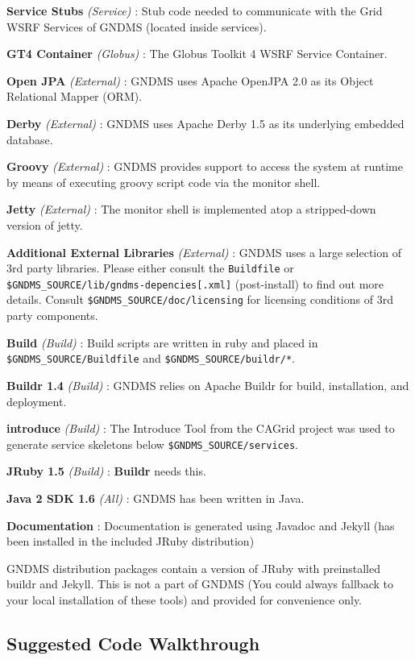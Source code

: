 \documentclass{article}
\begin{document}
\textbf{Service Stubs} \emph{(Service)} : Stub code needed to
communicate with the Grid WSRF Services of GNDMS (located inside
services).

\textbf{GT4 Container} \emph{(Globus)} : The Globus Toolkit 4 WSRF
Service Container.

\textbf{Open JPA} \emph{(External)} : GNDMS uses Apache OpenJPA 2.0
as its Object Relational Mapper (ORM).

\textbf{Derby} \emph{(External)} : GNDMS uses Apache Derby 1.5 as
its underlying embedded database.

\textbf{Groovy} \emph{(External)} : GNDMS provides support to
access the system at runtime by means of executing groovy script
code via the monitor shell.

\textbf{Jetty} \emph{(External)} : The monitor shell is implemented
atop a stripped-down version of jetty.

\textbf{Additional External Libraries} \emph{(External)} : GNDMS
uses a large selection of 3rd party libraries. Please either
consult the \verb!Buildfile! or
\verb!$GNDMS_SOURCE/lib/gndms-depencies[.xml]! (post-install) to
find out more details. Consult \verb!$GNDMS_SOURCE/doc/licensing!
for licensing conditions of 3rd party components.

\textbf{Build} \emph{(Build)} : Build scripts are written in ruby
and placed in \verb!$GNDMS_SOURCE/Buildfile! and
\verb!$GNDMS_SOURCE/buildr/*!.

\textbf{Buildr 1.4} \emph{(Build)} : GNDMS relies on Apache Buildr
for build, installation, and deployment.

\textbf{introduce} \emph{(Build)} : The Introduce Tool from the
CAGrid project was used to generate service skeletons below
\verb!$GNDMS_SOURCE/services!.

\textbf{JRuby 1.5} \emph{(Build)} : \textbf{Buildr} needs this.

\textbf{Java 2 SDK 1.6} \emph{(All)} : GNDMS has been written in
Java.

\textbf{Documentation} : Documentation is generated using Javadoc
and Jekyll (has been installed in the included JRuby distribution)

GNDMS distribution packages contain a version of JRuby with
preinstalled buildr and Jekyll. This is not a part of GNDMS (You
could always fallback to your local installation of these tools)
and provided for convenience only.

\subsection{Suggested Code Walkthrough}
\end{document}
